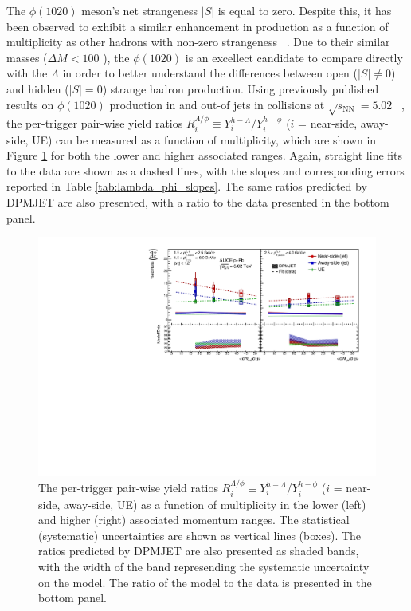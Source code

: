 The $\phi(1020)$ meson's net strangeness $|S|$ is equal to zero. Despite this, it has been observed to exhibit a similar enhancement in production as a function of multiplicity as other hadrons with non-zero strangeness ~\cite{PhiEnhancement}. Due to their similar masses ($\Delta M < 100$ \MeVmass), the $\phi(1020)$ is an excellect candidate to compare directly with the $\Lambda$ in order to better understand the differences between open ($|S| \neq 0$) and hidden ($|S| = 0$) strange hadron production. Using previously published results on $\phi(1020)$ production in and out-of jets in \pPb collisions at $\sqrt{s_{\text{NN}}} = 5.02$ \TeV ~\cite{JustinPaper}, the per-trigger pair-wise yield ratios $R_{i}^{\Lambda/\phi} \equiv Y_{i}^{h-\Lambda}/Y_{i}^{h-\phi}$ ($i$ = near-side, away-side, UE) can be measured as a function of multiplicity, which are shown in Figure \ref{fig:lambda_phi_ratio} for both the lower and higher associated \pt ranges. Again, straight line fits to the data are shown as a dashed lines, with the slopes and corresponding errors reported in Table \ref{tab:lambda_phi_slopes}. The same ratios predicted by DPMJET are also presented, with a ratio to the data presented in the bottom panel.


\begin{figure}[h!]
\centering
\includegraphics[width=\textwidth]{figures/results/final_lambda_phi_ratio_plot_new_x_axis_model_ratio.pdf}
\caption{The per-trigger pair-wise yield ratios $R_{i}^{\Lambda/\phi} \equiv Y_{i}^{h-\Lambda}$/$Y_{i}^{h-\phi}$ ($i$ = near-side, away-side, UE) as a function of multiplicity in the lower (left) and higher (right) associated momentum ranges. The statistical (systematic) uncertainties are shown as vertical lines (boxes).  The ratios predicted by DPMJET are also presented as shaded bands, with the width of the band represending the systematic uncertainty on the model. The ratio of the model to the data is presented in the bottom panel.}
\label{fig:lambda_phi_ratio}
\end{figure}

